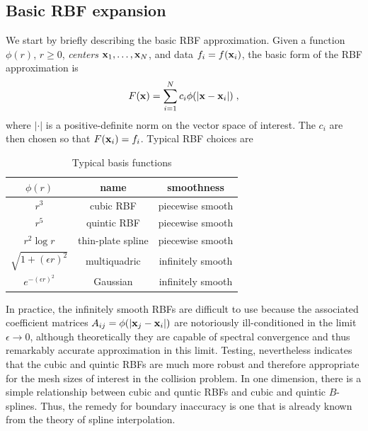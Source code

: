\subsection{Basic RBF expansion}

We start by briefly describing the basic RBF approximation.
Given a function $\phi(r)$, $r \ge 0$, {\it centers} 
${\bf x}_1,\ldots,{\bf x}_N$, and data $f_i = f({\bf x}_i)$, the basic 
form of the RBF approximation is
%
\begin{equation}
F({\bf x}) = \sum_{i=1}^N c_i \phi(|{\bf x}-{\bf x}_i|) \; ,
\label{eq.basicrbf}
\end{equation}
%
where $|\cdot|$ is a positive-definite norm on the vector 
space of interest.  The $c_i$ are then chosen so that 
$F({\bf x}_i) = f_i$.  Typical RBF choices are 

\begin{table}[h]
\begin{center}
\caption{Typical basis functions}
\begin{tabular}{c c c} \hline\hline
 $\phi(r)$ & name & smoothness \\ \hline
 $r^3$ & cubic RBF & piecewise smooth \\ 
 $r^5$ & quintic RBF & piecewise smooth \\ 
 $r^2 \log r$ & thin-plate spline & piecewise smooth \\ 
 $\sqrt{1+(\epsilon r)^2}$ & multiquadric & infinitely smooth \\ 
 $e^{-(\epsilon r)^2}$ & Gaussian & infinitely smooth \\ 
\hline\hline
\end{tabular}
\label{tab.error}
\end{center}
\end{table}

In practice, the infinitely smooth RBFs are difficult to use 
because the associated coefficient matrices $A_{ij} = \phi(|{\bf x}_j-{\bf x}_i|)$ 
are notoriously ill-conditioned in the limit $\epsilon \rightarrow 0$, 
although theoretically they are capable of spectral convergence 
and thus remarkably accurate approximation in this limit.  Testing, 
nevertheless indicates that the cubic and quintic RBFs are much 
more robust and therefore appropriate for the mesh sizes of interest 
in the collision problem.  In one dimension, there is a simple 
relationship between cubic and quntic RBFs and cubic and quintic 
$B$-splines.  Thus, the remedy for boundary inaccuracy is one that 
is already known from the theory of spline interpolation. 

